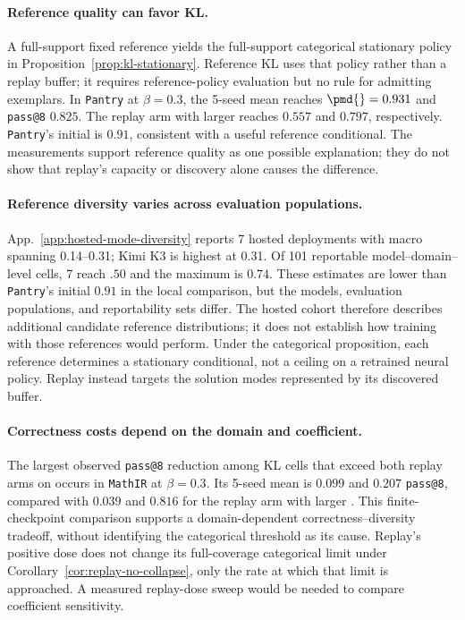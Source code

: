 \paragraph{Reference quality can favor KL.}
A full-support fixed reference yields the full-support categorical
stationary policy in Proposition~\ref{prop:kl-stationary}. Reference KL
uses that policy rather than a replay buffer; it requires reference-policy
evaluation but no rule for admitting exemplars. In \texttt{Pantry} at
$\beta=0.3$, the 5-seed mean reaches
$\pmd{}=0.931$ and \texttt{pass@8} $0.825$.
The replay arm with larger \pmd{} reaches $0.557$ and
$0.797$, respectively. \texttt{Pantry}'s initial \pmd{} is
$0.91$, consistent with a useful reference conditional.
The measurements support reference quality as one possible explanation;
they do not show that replay's capacity or discovery alone causes the
difference.

\paragraph{Reference diversity varies across evaluation populations.}
App.~\ref{app:hosted-mode-diversity} reports 7
hosted deployments with macro \pmd{} spanning 0.14--0.31;
Kimi K3 is highest at 0.31. Of
101 reportable model--domain--level cells,
7 reach $.50$ and the maximum is
$0.74$. These estimates are lower than \texttt{Pantry}'s initial
$0.91$ in the local comparison, but the models,
evaluation populations, and reportability sets differ. The hosted cohort
therefore describes additional candidate reference distributions; it does
not establish how training with those references would perform. Under the
categorical proposition, each reference determines a stationary
conditional, not a ceiling on a retrained neural policy. Replay instead
targets the solution modes represented by its discovered buffer.

\paragraph{Correctness costs depend on the domain and coefficient.}
The largest observed \texttt{pass@8} reduction among KL cells that exceed
both replay arms on \pmd{} occurs in \texttt{MathIR} at
$\beta=0.3$. Its 5-seed mean is
$0.099$ \pmd{} and $0.207$ \texttt{pass@8},
compared with $0.039$ and $0.816$ for
the replay arm with larger \pmd{}. This finite-checkpoint comparison
supports a domain-dependent correctness--diversity tradeoff, without
identifying the categorical threshold as its cause.
Replay's positive dose does not change its full-coverage categorical
limit under Corollary~\ref{cor:replay-no-collapse}, only the rate at which
that limit is approached. A measured
replay-dose sweep would be needed to compare coefficient sensitivity.

